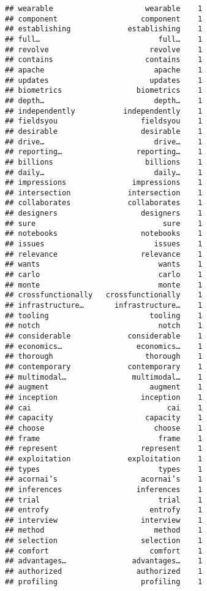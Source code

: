 \documentclass[]{article}
\begin{document}
\begin{verbatim}
## wearable                     wearable    1
## component                   component    1
## establishing             establishing    1
## full…                           full…    1
## revolve                       revolve    1
## contains                     contains    1
## apache                         apache    1
## updates                       updates    1
## biometrics                 biometrics    1
## depth…                         depth…    1
## independently           independently    1
## fieldsyou                   fieldsyou    1
## desirable                   desirable    1
## drive…                         drive…    1
## reporting…                 reporting…    1
## billions                     billions    1
## daily…                         daily…    1
## impressions               impressions    1
## intersection             intersection    1
## collaborates             collaborates    1
## designers                   designers    1
## sure                             sure    1
## notebooks                   notebooks    1
## issues                         issues    1
## relevance                   relevance    1
## wants                           wants    1
## carlo                           carlo    1
## monte                           monte    1
## crossfunctionally   crossfunctionally    1
## infrastructure…       infrastructure…    1
## tooling                       tooling    1
## notch                           notch    1
## considerable             considerable    1
## economics…                 economics…    1
## thorough                     thorough    1
## contemporary             contemporary    1
## multimodal…               multimodal…    1
## augment                       augment    1
## inception                   inception    1
## cai                               cai    1
## capacity                     capacity    1
## choose                         choose    1
## frame                           frame    1
## represent                   represent    1
## exploitation             exploitation    1
## types                           types    1
## acornai’s                   acornai’s    1
## inferences                 inferences    1
## trial                           trial    1
## entrofy                       entrofy    1
## interview                   interview    1
## method                         method    1
## selection                   selection    1
## comfort                       comfort    1
## advantages…               advantages…    1
## authorized                 authorized    1
## profiling                   profiling    1

\end{verbatim}
\end{document}
